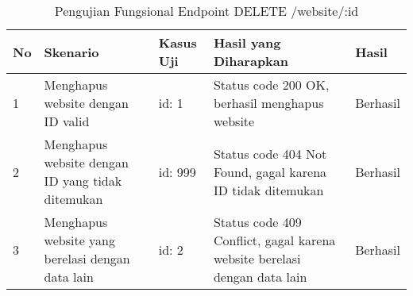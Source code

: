 \begin{table}[H]
    \centering
    \begin{tabular}{|p{0.5cm}|p{3cm}|p{5cm}|p{5cm}|p{1.5cm}|}
        \hline
        \rowcolor[HTML]{DAE8FC} 
        \textbf{No} & \textbf{Skenario} & \textbf{Kasus Uji} & \textbf{Hasil yang Diharapkan} & \textbf{Hasil} \\ \hline
        1 & Menghapus website dengan ID valid & 
        id: 1 & 
        Status code 200 OK, berhasil menghapus website & 
        Berhasil \\ \hline
        2 & Menghapus website dengan ID yang tidak ditemukan & 
        id: 999 & 
        Status code 404 Not Found, gagal karena ID tidak ditemukan & 
        Berhasil \\ \hline
        3 & Menghapus website yang berelasi dengan data lain & 
        id: 2 & 
        Status code 409 Conflict, gagal karena website berelasi dengan data lain & 
        Berhasil \\ \hline
    \end{tabular}
    \caption{Pengujian Fungsional Endpoint DELETE /website/:id}
    \label{tab:website_delete_testing}
\end{table}
